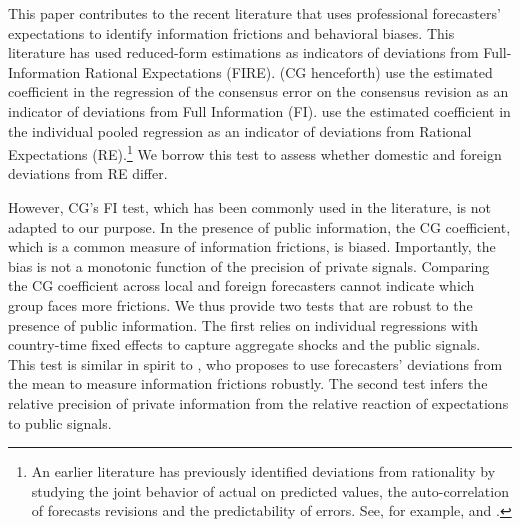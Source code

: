 This paper contributes to the recent literature that uses professional forecasters' expectations to identify information frictions and behavioral biases. This literature has used reduced-form estimations as indicators of deviations from Full-Information Rational Expectations (FIRE). \citet{CoibionGorodnichenko2015} (CG henceforth) use the estimated coefficient in the regression of the consensus error on the consensus revision as an indicator of deviations from Full Information (FI). \citet{Bordaloetal2020} use the estimated coefficient in the individual pooled regression as an indicator of deviations from Rational Expectations (RE).\footnote{An earlier literature has previously identified deviations from rationality by studying the joint behavior of actual on predicted values, the auto-correlation of forecasts revisions and the predictability of errors. See, for example, \citet{MincerZarnowitz1969} and \citet{Nordhaus1987}.} We borrow this test to assess whether domestic and foreign deviations from RE differ.

However, CG's FI test, which has been commonly used in the literature, is not adapted to our purpose. In the presence of public information, the CG coefficient, which is a common measure of information frictions, is biased. Importantly, the bias is not a monotonic function of the precision of private signals. Comparing the CG coefficient across local and foreign forecasters cannot indicate which group faces more frictions. We thus provide two tests that are robust to the presence of public information. The first relies on individual regressions with country-time fixed effects to capture aggregate shocks and the public signals. This test is similar in spirit to \citet{Goldstein2021}, who proposes to use forecasters' deviations from the mean to measure information frictions robustly. The second test infers the relative precision of private information from the relative reaction of expectations to public signals.

